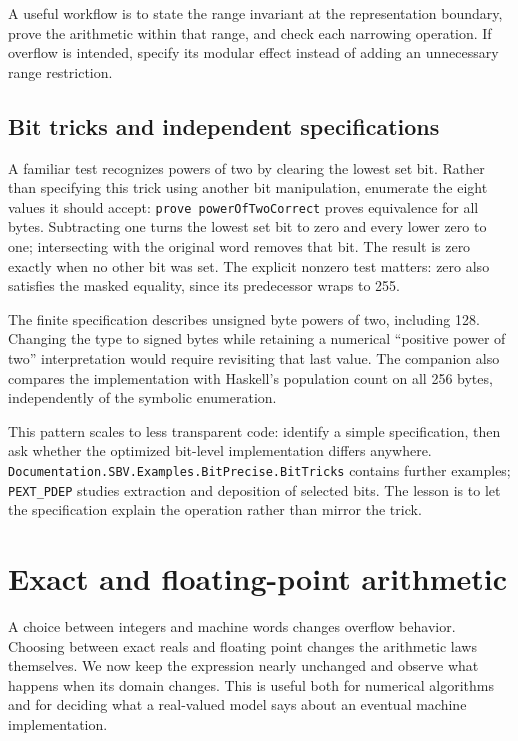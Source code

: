 \documentclass[review]{jfp-epi}
\newcommand{\code}[1]{\texttt{#1}}
\begin{document}
A useful workflow is to state the range invariant at the representation
boundary, prove the arithmetic within that range, and check each narrowing
operation. If overflow is intended, specify its modular effect instead of
adding an unnecessary range restriction.


\subsection{Bit tricks and independent specifications}
\label{sec:bit-tricks}

A familiar test recognizes powers of two by clearing the lowest set bit.
Rather than specifying this trick using another bit manipulation, enumerate
the eight values it should accept:
\code{prove powerOfTwoCorrect} proves equivalence for all bytes. Subtracting one
turns the lowest set bit to zero and every lower zero to one; intersecting with
the original word removes that bit. The result is zero exactly when no other
bit was set. The explicit nonzero test matters: zero also satisfies the masked
equality, since its predecessor wraps to 255.

The finite specification describes unsigned byte powers of two, including 128.
Changing the type to signed bytes while retaining a numerical ``positive power
of two'' interpretation would require revisiting that last value. The companion
also compares the implementation with Haskell's population count on all 256
bytes, independently of the symbolic enumeration.

This pattern scales to less transparent code: identify a simple specification,
then ask whether the optimized bit-level implementation differs anywhere.
\code{Documentation.\allowbreak SBV.\allowbreak Examples.\allowbreak BitPrecise.\allowbreak BitTricks} contains further examples;
\code{PEXT\_PDEP} studies extraction and deposition of selected bits. The lesson
is to let the specification explain the operation rather than mirror the trick.


\section{Exact and floating-point arithmetic}
\label{sec:arithmetic-models}

A choice between integers and machine words changes overflow behavior. Choosing
between exact reals and floating point changes the arithmetic laws themselves.
We now keep the expression nearly unchanged and observe what happens when its
domain changes. This is useful both for numerical algorithms and for deciding
what a real-valued model says about an eventual machine implementation.
\end{document}

